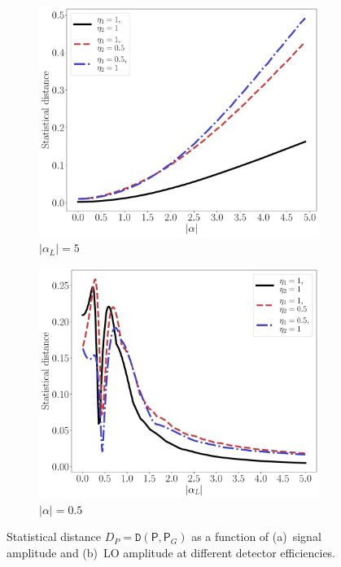 \documentclass[%
reprint,
superscriptaddress,
 amsmath,amssymb,amsfonts,
 aps,
 pra,
 longbibliography
]{revtex4-2}
\newcommand{\prob}{\mathsf{P}}
\begin{document}
\begin{figure}[!htb]
  \centering
  \begin{subfigure}{0.49\textwidth}
    \includegraphics[width=\linewidth]{pics/homodyne/ED = ED(a)_eta.pdf}
    \caption{$|\alpha_L|=5$}
    \label{fig:amp_05}
\end{subfigure}
  \begin{subfigure}{0.49\textwidth}
    \includegraphics[width=\linewidth]{pics/homodyne/ED = ED(aL)_eta.pdf}
    \caption{$|\alpha|=0.5$}
    \label{fig:amp_01}
\end{subfigure}
\caption{
  Statistical distance $D_P=\mathtt{D}(\prob,\prob_G)$
  as a function of (a)~signal amplitude and (b)~LO amplitude at different
          detector efficiencies.
        }
  \label{fig:amplitude}
\end{figure}
\end{document}
